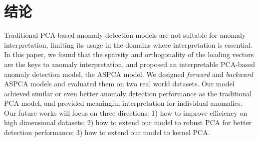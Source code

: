 \chapter{结论}

Traditional PCA-based anomaly detection models are not suitable for anomaly interpretation, limiting its usage in the domains where interpretation is essential.  In this paper, we found that the sparsity and orthogonality of the loading vectors are the keys to anomaly interpretation, and proposed an interpretable PCA-based anomaly detection model, the ASPCA model. We designed \emph{forward} and \emph{backward} ASPCA models and evaluated them on two real world datasets. Our model achieved similar or even better anomaly detection performance as the traditional PCA model, and provided meaningful interpretation for individual anomalies. Our future works will focus on three directions: 1) how to improve efficiency on high dimensional datasets; 2) how to extend our model to robust PCA for better detection performance; 3) how to extend our model to kernel PCA.
